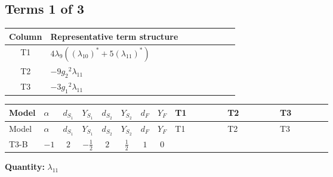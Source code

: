 \documentclass[8pt]{article}
\begin{document}
\begin{landscape}
\subsection*{Terms 1 of 3}
\begin{center}
\begin{tabular}{@{}c >{\raggedright\arraybackslash}p{0.82\linewidth}@{}}
\toprule
Column & Representative term structure \\
\midrule
T1 & \(\displaystyle 4 {\lambda_{9}} (\left({\lambda_{10}}\right)^{*}+5 \left({\lambda_{11}}\right)^{*})\) \\
\midrule
T2 & \(\displaystyle -9 {g_2}^2 {\lambda_{11}}\) \\
\midrule
T3 & \(\displaystyle -3 {g_1}^2 {\lambda_{11}}\) \\
\midrule
\bottomrule
\end{tabular}
\end{center}
\smallskip
\tiny
\begin{longtable}{@{}llcccccc >{\raggedright\arraybackslash}p{0.21\linewidth} >{\raggedright\arraybackslash}p{0.21\linewidth} >{\raggedright\arraybackslash}p{0.21\linewidth}@{}}
\toprule
Model & $\alpha$ & $d_{S_1}$ & $Y_{S_1}$ & $d_{S_2}$ & $Y_{S_2}$ & $d_F$ & $Y_F$ & T1 & T2 & T3 \\
\midrule
\endfirsthead
\toprule
Model & $\alpha$ & $d_{S_1}$ & $Y_{S_1}$ & $d_{S_2}$ & $Y_{S_2}$ & $d_F$ & $Y_F$ & T1 & T2 & T3 \\
\midrule
\endhead
T3-B & $-1$ & $2$ & $-\frac{1}{2}$ & $2$ & $\frac{1}{2}$ & $1$ & $0$ & \scriptsize\adjustbox{max width=\linewidth}{$\begin{gathered} 4 {\lambda_{9}} (\left({\lambda_{10}}\right)^{*}+5 \left({\lambda_{11}}\right)^{*})\end{gathered}$} & \scriptsize\adjustbox{max width=\linewidth}{$\begin{gathered} -9 {g_2}^2 {\lambda_{11}}\end{gathered}$} & \scriptsize\adjustbox{max width=\linewidth}{$\begin{gathered} -3 {g_1}^2 {\lambda_{11}}\end{gathered}$} \\
\midrule
\bottomrule
\end{longtable}
\clearpage
\noindent\textbf{Quantity: }$\lambda_{11}$\par\smallskip

\end{landscape}
\end{document}
